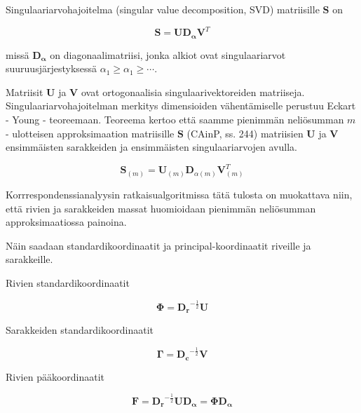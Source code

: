 \documentclass[
  finnish,
]{book}
\begin{document}
Singulaariarvohajoitelma (singular value decomposition, SVD) matriisille \(\boldsymbol{S}\) on

\begin{equation}
\boldsymbol{S} = \boldsymbol{U} \boldsymbol{D_{\alpha}} \boldsymbol{V}^{T}
\label{eq:svd2}
\end{equation}

missä \(\boldsymbol{D_{\alpha}}\) on diagonaalimatriisi, jonka alkiot ovat
singulaariarvot suuruusjärjestyksessä \(\alpha_{1}\geq \alpha_{1} \geq \cdots\).

Matriisit \(\boldsymbol{U}\) ja \(\boldsymbol{V}\) ovat ortogonaalisia
singulaarivektoreiden matriiseja. Singulaariarvohajoitelman merkitys dimensioiden
vähentämiselle perustuu Eckart - Young - teoreemaan. Teoreema kertoo
että saamme pienimmän neliösumman \(m\) - ulotteisen approksimaation matriisille
\(\boldsymbol{S}\) (CAinP, ss. 244) matriisien \(\boldsymbol{U}\) ja \(\boldsymbol{V}\)
ensimmäisten sarakkeiden ja ensimmäisten singulaariarvojen avulla.

\begin{equation}
\boldsymbol{S}_{(m)} = \boldsymbol{U}_{(m)} \boldsymbol{D}_{\alpha(m)} \boldsymbol{V}_{(m)}^{T}
\label{eq:svd3}
\end{equation}

Korrrespondenssianalyysin ratkaisualgoritmissa tätä tulosta on muokattava niin,
että rivien ja sarakkeiden massat huomioidaan pienimmän neliösumman
approksimaatiossa painoina.

Näin saadaan standardikoordinaatit ja principal-koordinaatit riveille ja
sarakkeille.

Rivien standardikoordinaatit

\begin{equation}
\boldsymbol{\Phi} = \boldsymbol{D_r}^{-\frac{1}{2}} \boldsymbol{U}
\label{eq:rivistd1}
\end{equation}

Sarakkeiden standardikoordinaatit

\begin{equation}
 \boldsymbol{\Gamma} = \boldsymbol{D_c}^{-\frac{1}{2}} \boldsymbol{V}
 \label{eq:sarakestd1}
\end{equation}

Rivien pääkoordinaatit

\begin{equation}
 \boldsymbol{F} =   \boldsymbol{D_r}^{-\frac{1}{2}} \boldsymbol{U}  \boldsymbol{D_{\alpha}} = \boldsymbol{\Phi} \boldsymbol{D_{\alpha}}
\label{eq:riviprinc1}
\end{equation}
\end{document}
